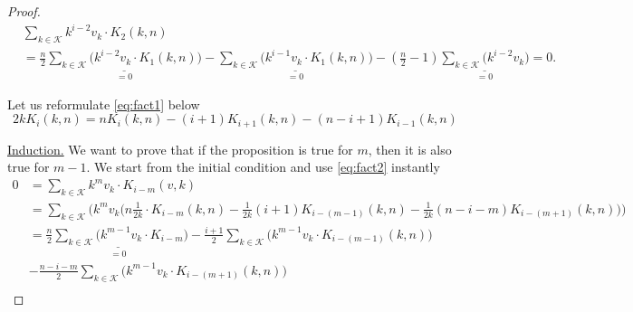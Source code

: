 \begin{proof}
    \begin{equation*}
    \begin{split}
        &\sum_{k \in \mathcal{K}} k^{i-2}v_k \cdot K_{2}(k, n)\\
        &= \frac{n}{2}\underset{=0}{\underline{\sum_{k \in \mathcal{K}} \Big( k^{i-2}v_k \cdot K_1(k, n) \Big)}} - \underset{=0}{\underline{\sum_{k \in \mathcal{K}} \Big( k^{i-1}v_k \cdot K_1(k,n) \Big)}} - (\frac{n}{2}-1)\underset{=0}{\underline{\sum_{k \in \mathcal{K}} \Big( k^{i-2}v_k \Big)}} = 0.
    \end{split}
    \end{equation*}

    Let us reformulate \cref{eq:fact1} below
    \begin{equation}\label{eq:fact2}
        2kK_i(k, n) = nK_i(k, n) - (i+1)K_{i+1}(k, n) - (n - i + 1)K_{i-1}(k, n)
    \end{equation}

    \underline{Induction.} We want to prove that if the proposition is true for $m$, then it is also true for $m -1$. We start from the initial condition and use \cref{eq:fact2} instantly
    \begin{equation*}
        \begin{split}
            0 &= \sum_{k \in \mathcal{K}}k^mv_k \cdot K_{i - m}(v, k)\\
            &= \sum_{k \in \mathcal{K}} \Big( k^mv_k \Big( n\frac{1}{2k} \cdot K_{i -m}(k, n) - \frac{1}{2k}(i+1)K_{i-(m-1)}(k,n) - \frac{1}{2k}(n-i-m)K_{i-(m+1)}(k,n) \Big)\Big)\\
            &= \frac{n}{2} \underset{=0}{\underline{\sum_{k \in \mathcal{K}}\Big( k^{m-1}v_k \cdot K_{i-m}}} \Big) - \frac{i+1}{2}\sum_{k \in \mathcal{K}}\Big( k^{m-1}v_k \cdot K_{i-(m-1)}(k,n)\Big)\\ &- \frac{n - i - m}{2}\sum_{k \in \mathcal{K}} \Big( k^{m-1}v_k \cdot K_{i-(m+1)}(k,n) \Big)\\
        \end{split}
    \end{equation*}

\end{proof}


